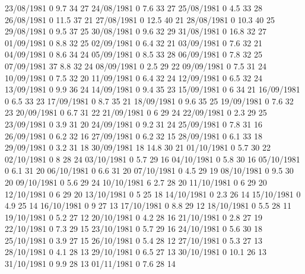 23/08/1981  0      9.7    34     27 
24/08/1981  0      7.6    33     27 
25/08/1981  0      4.5    33     28 
26/08/1981  0      11.5   37     21 
27/08/1981  0      12.5   40     21 
28/08/1981  0      10.3   40     25 
29/08/1981  0      9.5    37     25 
30/08/1981  0      9.6    32     29 
31/08/1981  0      16.8   32     27 
01/09/1981  0      8.8    32     25 
02/09/1981  0      6.4    32     21 
03/09/1981  0      7.6    32     21 
04/09/1981  0      8.6    34     24 
05/09/1981  0      8.5    33     28 
06/09/1981  0      7.8    32     25 
07/09/1981  37     8.8    32     24 
08/09/1981  0      2.5    29     22 
09/09/1981  0      7.5    31     24 
10/09/1981  0      7.5    32     20 
11/09/1981  0      6.4    32     24 
12/09/1981  0      6.5    32     24 
13/09/1981  0      9.9    36     24 
14/09/1981  0      9.4    35     23 
15/09/1981  0      6      34     21 
16/09/1981  0      6.5    33     23 
17/09/1981  0      8.7    35     21 
18/09/1981  0      9.6    35     25 
19/09/1981  0      7.6    32     23 
20/09/1981  0      6.7    31     22 
21/09/1981  0      6      29     24 
22/09/1981  0      2.3    29     25 
23/09/1981  0      3.9    31     20 
24/09/1981  0      9.2    31     24 
25/09/1981  0      7.8    31     16 
26/09/1981  0      6.2    32     16 
27/09/1981  0      6.2    32     15 
28/09/1981  0      6.1    33     18 
29/09/1981  0      3.2    31     18 
30/09/1981  18     14.8   30     21 
01/10/1981  0      5.7    30     22 
02/10/1981  0      8      28     24 
03/10/1981  0      5.7    29     16 
04/10/1981  0      5.8    30     16 
05/10/1981  0      6.1    31     20 
06/10/1981  0      6.6    31     20 
07/10/1981  0      4.5    29     19 
08/10/1981  0      9.5    30     20 
09/10/1981  0      5.6    29     24 
10/10/1981  6      2.7    28     20 
11/10/1981  0      6      29     20 
12/10/1981  0      6      29     20 
13/10/1981  0      5      25     18 
14/10/1981  0      2.3    26     14 
15/10/1981  0      4.9    25     14 
16/10/1981  0      9      27     13 
17/10/1981  0      8.8    29     12 
18/10/1981  0      5.5    28     11 
19/10/1981  0      5.2    27     12 
20/10/1981  0      4.2    28     16 
21/10/1981  0      2.8    27     19 
22/10/1981  0      7.3    29     15 
23/10/1981  0      5.7    29     16 
24/10/1981  0      5.6    30     18 
25/10/1981  0      3.9    27     15 
26/10/1981  0      5.4    28     12 
27/10/1981  0      5.3    27     13 
28/10/1981  0      4.1    28     13 
29/10/1981  0      6.5    27     13 
30/10/1981  0      10.1   26     13 
31/10/1981  0      9.9    28     13 
01/11/1981  0      7.6    28     14 
